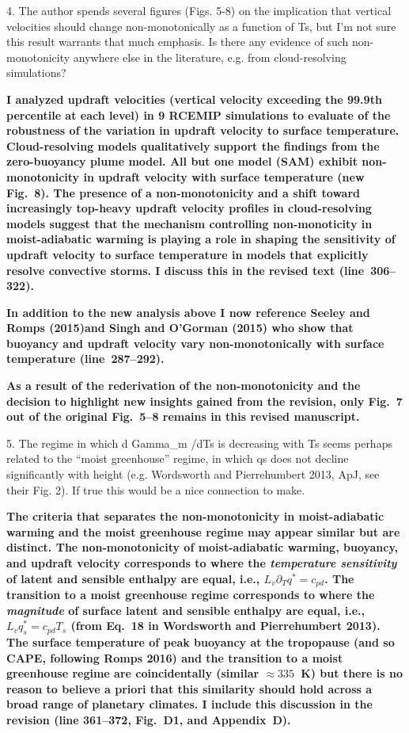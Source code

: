 \documentclass{article}
\begin{document}
\par
4. The author spends several figures (Figs. 5-8) on the implication that vertical velocities should change non-monotonically as a function of Ts, but I'm not sure this result warrants that much emphasis. Is there any evidence of such non-monotonicity anywhere else in the literature, e.g. from cloud-resolving simulations?
\par
\textbf{I analyzed updraft velocities (vertical velocity exceeding the 99.9th percentile at each level) in 9 RCEMIP simulations to evaluate of the robustness of the variation in updraft velocity to surface temperature. Cloud-resolving models qualitatively support the findings from the zero-buoyancy plume model. All but one model (SAM) exhibit non-monotonicity in updraft velocity with surface temperature (new Fig.~8). The presence of a non-monotonicity and a shift toward increasingly top-heavy updraft velocity profiles in cloud-resolving models suggest that the mechanism controlling non-monoticity in moist-adiabatic warming is playing a role in shaping the sensitivity of updraft velocity to surface temperature in models that explicitly resolve convective storms. I discuss this in the revised text (line~306--322).}
\par
\textbf{In addition to the new analysis above I now reference Seeley and Romps (2015)and Singh and O'Gorman (2015) who show that buoyancy and updraft velocity vary non-monotonically with surface temperature (line~287--292).}
\par
\textbf{As a result of the rederivation of the non-monotonicity and the decision to highlight new insights gained from the revision, only Fig.~7 out of the original Fig.~5--8 remains in this revised manuscript.}
\par
5. The regime in which d Gamma\_m /dTs is decreasing with Ts seems perhaps related to the ``moist greenhouse'' regime, in which qs does not decline significantly with height (e.g. Wordsworth and Pierrehumbert 2013, ApJ, see their Fig. 2). If true this would be a nice connection to make.
\par
\textbf{The criteria that separates the non-monotonicity in moist-adiabatic warming and the moist greenhouse regime may appear similar but are distinct. The non-monotonicity of moist-adiabatic warming, buoyancy, and updraft velocity corresponds to where the \textit{temperature sensitivity} of latent and sensible enthalpy are equal, i.e., $L_v\partial_T q^* = c_{pd}$. The transition to a moist greenhouse regime corresponds to where the \textit{magnitude} of surface latent and sensible enthalpy are equal, i.e., $L_v q_s^* = c_{pd} T_s$ (from Eq.~18 in Wordsworth and Pierrehumbert 2013). The surface temperature of peak buoyancy at the tropopause (and so CAPE, following Romps 2016) and the transition to a moist greenhouse regime are coincidentally (similar $\approx335$~K) but there is no reason to believe a priori that this similarity should hold across a broad range of planetary climates. I include this discussion in the revision (line 361--372, Fig.~D1, and Appendix~D).}
\end{document}
